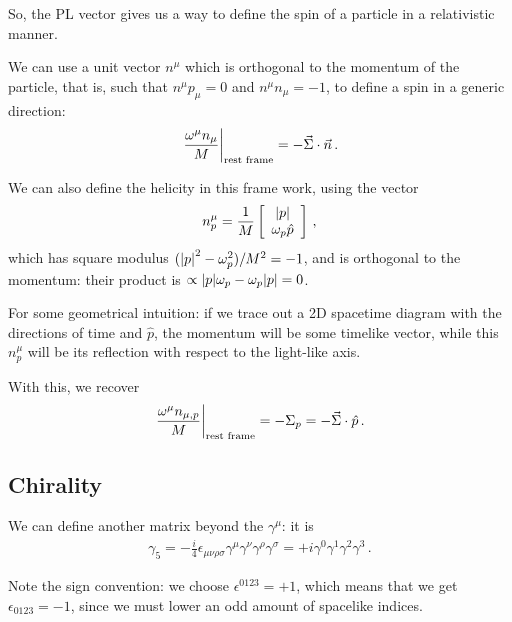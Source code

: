 \documentclass[main.tex]{subfiles}
\begin{document}

So, the PL vector gives us a way to define the spin of a particle in a relativistic manner. 

We can use a unit vector \(n^{\mu }\) which is orthogonal to the momentum of the particle, that is, such that \(n^{\mu } p_{\mu }=0\) and \(n^{\mu } n_{\mu }=-1\), to define a spin in a generic direction: 
%
\begin{align}
\eval{\frac{\omega^{\mu }n_{\mu }}{M}}_{\text{rest frame}} = - \vec{\Sigma} \cdot \vec{n}
\,.
\end{align}

We can also define the helicity in this frame work, using the vector 
%
\begin{subequations}
\begin{align}
n^{\mu }_{p} = \frac{1}{M} \left[\begin{array}{c}
\abs{p} \\ 
\omega_{p} \hat{p}
\end{array}\right]
\,,
\end{align}
\end{subequations}
%
which has square modulus \((\abs{p}^2 - \omega_{p}^2) / M^2 = -1\), and is orthogonal to the momentum: their product is \(\propto \abs{p} \omega_{p}  - \omega_{p} \abs{p} = 0\).

For some geometrical intuition: if we trace out a 2D spacetime diagram with the directions of time and \(\hat{p}\), the momentum will be some timelike vector, while this \(n^{\mu }_{p}\) will be its reflection with respect to the light-like axis.

With this, we recover 
%
\begin{align}
\eval{\frac{\omega^{\mu }n_{\mu , p}}{M}}_{\text{rest frame}}
= - \Sigma_{p} = - \vec{\Sigma} \cdot \hat{p}
\,.
\end{align}
%
\subsection{Chirality}

We can define another matrix beyond the \(\gamma^{\mu }\): it is 
%
\begin{align}
\gamma_{5} = - \frac{i}{4} \epsilon_{\mu \nu \rho \sigma } \gamma^{\mu } \gamma^{\nu } \gamma^{\rho } \gamma^{\sigma } = + i \gamma^{0} \gamma^{1} \gamma^{2} \gamma^{3}
\,.
\end{align}

Note the sign convention: we choose \(\epsilon^{0123} = +1 \), which means that we get \(\epsilon_{0123} = -1\), since we must lower an odd amount of spacelike indices.
\end{document}
